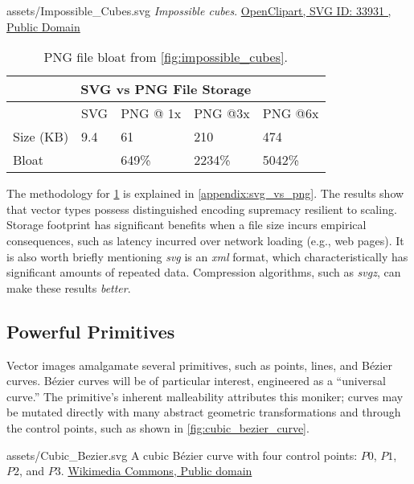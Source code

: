 \svg
{assets/Impossible_Cubes.svg}
{\label{fig:impossible_cubes}\textit{Impossible cubes}.}
{\href{https://freesvg.org/by/OpenClipart}{OpenClipart, SVG ID: 33931 , Public Domain}}\medskip

\begin{table}[H]
\centering
\begin{tabular}{ |p{2cm}||p{2cm}|p{2cm}|p{2cm}|p{2cm}|  }
\hline
\multicolumn{5}{|c|}{SVG vs PNG File Storage} \\
\hline
&SVG&PNG @ 1x&PNG @3x&PNG @6x\\
\hline
Size (KB)&9.4&61&210&474\\
\hline
Bloat&&649\%&2234\%&5042\%\\
\hline
\end{tabular}
\caption{\label{tab:impossible_cubes_stats}PNG file bloat from \cref{fig:impossible_cubes}.}
\end{table}
\medskip

The methodology for \cref{tab:impossible_cubes_stats} is explained in \cref{appendix:svg_vs_png}. The results show that vector types possess distinguished encoding supremacy resilient to scaling. Storage footprint has significant benefits when a file size incurs empirical consequences, such as latency incurred over network loading (e.g., web pages). It is also worth briefly mentioning \textit{svg} is an \textit{xml} format, which characteristically has significant amounts of repeated data. Compression algorithms, such as \textit{svgz}, can make these results \emph{better}.

\subsection{Powerful Primitives}
Vector images amalgamate several primitives, such as points, lines, and Bézier curves. Bézier curves will be of particular interest, engineered as a ``universal curve.'' The primitive's inherent malleability attributes this moniker; curves may be mutated directly with many abstract geometric transformations and through the control points, such as shown in \cref{fig:cubic_bezier_curve}.\medskip

\svg
{assets/Cubic_Bezier.svg}
{A cubic Bézier curve with four control points: \(P0\), \(P1\), \(P2\), and \(P3\).}
{\href{https://commons.wikimedia.org/wiki/File:Bezier_curve.svg}{Wikimedia Commons, Public domain}}
\label{fig:cubic_bezier_curve}\medskip

